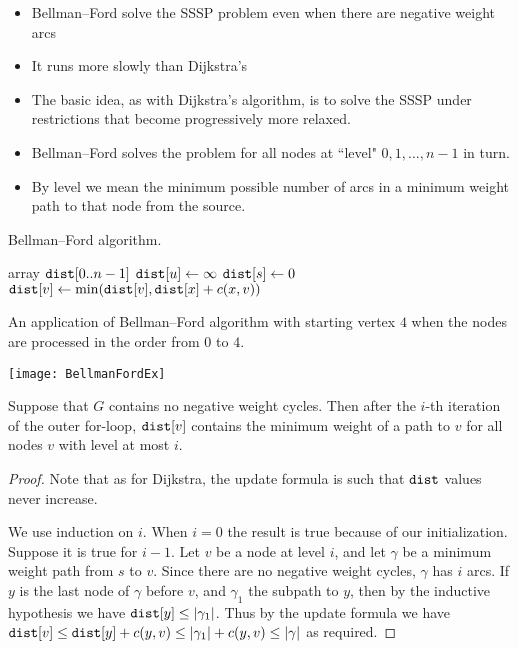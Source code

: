 \begin{itemize}
\item Bellman--Ford solve the SSSP problem even when there are negative weight arcs
\item It  runs more slowly than Dijkstra's 
\item  The basic idea, as with Dijkstra's algorithm, is to solve the SSSP under  restrictions
that become progressively more relaxed. 
\item  Bellman--Ford solves the problem for all
nodes at ``level" $0, 1, \dots , n-1$ in turn.
\item  By level we mean the
minimum possible number of arcs in a minimum weight path to that node from the
source.
\end{itemize}

\begin{algorithm}[H]
  \caption{Bellman--Ford algorithm.}
  \label{alg:bellford-code}
\begin{algorithmic}[1]
	\State array $\dist[0..n-1]$
		\State $\dist[u] \gets \infty$ 
	\EndFor
	\State $\dist[s] \gets 0$
				\State $\dist[v] \gets \min( \dist[v], \dist[x] + c(x,v) )$
			\EndFor
		\EndFor
	\EndFor
	\State \Return{$\dist$}
\EndFunction
\end{algorithmic}
\end{algorithm}

\begin{Boxample}[0]
An application of Bellman--Ford algorithm with starting vertex $4$
when the nodes are processed in the order from $0$ to $4$.
\begin{center} 
\texttt{[image: BellmanFordEx]}
\end{center}
\end{Boxample}

\begin{Theorem} 
Suppose that $G$ contains no negative weight cycles. Then after the $i$-th 
iteration of the outer for-loop, $\dist[v]$ contains the minimum weight of a 
path to $v$ for all nodes $v$ with level at most $i$.
\end{Theorem}

\begin{proof} 
Note that as for Dijkstra, the update formula is such that
$\dist$ values never increase.

We use induction on $i$. When $i=0$ the  result is true because of our
initialization. Suppose it is true for $i-1$. Let $v$ be a node at level
$i$, and let $\gamma$ be a minimum weight path from $s$ to $v$. Since
there are no negative weight cycles, $\gamma$ has $i$ arcs. If $y$
is the last node of $\gamma$ before $v$, and $\gamma_1$ the subpath to
$y$, then by the inductive hypothesis we have $\dist[y] \leq | \gamma_1
|$. Thus by the update formula we have $\dist[v] \leq \dist[y] + c(y, v)
\leq | \gamma_1 | + c(y, v) \leq | \gamma |$ as required.
\end{proof}

